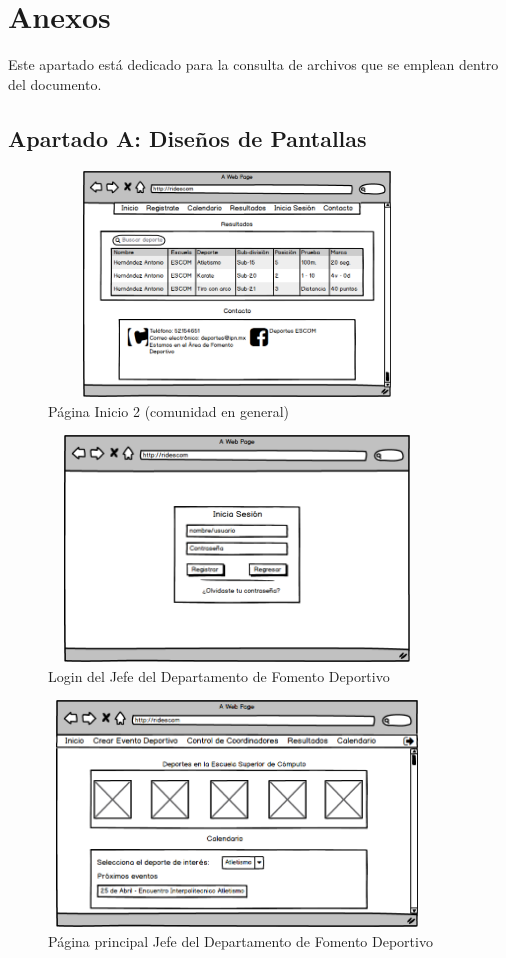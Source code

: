 \chapter{Anexos}
	\noident Este apartado está dedicado para la consulta de archivos que se emplean dentro del documento.
	\section{Apartado A: Diseños de Pantallas}
	
		\begin{figure}[hbt!]
			\centering
			\includegraphics[width=10cm, height=6cm]{Imagenes/Disenos/p20Iniciogeneral1.png}
			\caption{Página Inicio 2 (comunidad en general)}
			\label{Iniciogeneral1}
		\end{figure}
	
		\begin{figure}[hbt!]
			\centering
			\includegraphics[width=10cm, height=6cm]{Imagenes/Disenos/p2LoginJFD.png}
			\caption{Login del Jefe del Departamento de Fomento Deportivo}
			\label{LoginJFD}
		\end{figure}
	
		\begin{figure}[hbt!]
			\centering
			\includegraphics[width=10cm, height=6cm]{Imagenes/Disenos/p3InicioJefeFD.png}
			\caption{Página principal Jefe del Departamento de Fomento Deportivo}
			\label{IniciogeneralJFD}
		\end{figure}
			\pagebreak
	
